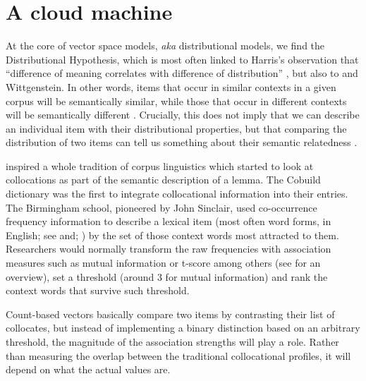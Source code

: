 \documentclass[
]{book}
\begin{document}
\hypertarget{vector-creation}{%
\section{A cloud machine}\label{vector-creation}}

At the core of vector space models, \emph{aka} distributional models, we find the Distributional Hypothesis, which is most often linked to Harris's observation that ``difference of meaning correlates with difference of distribution'' \autocite*[ 156]{harris_1954}, but also to \textcite{firth_1957a} and Wittgenstein.
In other words, items that occur in similar contexts in a given corpus will be semantically similar, while those that occur in different contexts will be semantically different \autocites[Ch. 6]{jurafsky.martin_2020}{lenci_2018}. Crucially, this does not imply that we can describe an individual item with their distributional properties, but that comparing the distribution of two items can tell us something about their semantic relatedness \autocite[ 19]{sahlgren_2006}.

\textcite{firth_1957a} inspired a whole tradition of corpus linguistics which started to look at collocations as part of the semantic description of a lemma. The Cobuild dictionary was the first to integrate collocational information into their entries. The Birmingham school, pioneered by John Sinclair, used co-occurrence frequency information to describe a lexical item (most often word forms, in English; see \textcite[29]{sinclair_1991} and; \textcite[23-24]{stubbs_1995}) by the set of those context words most attracted to them. Researchers would normally transform the raw frequencies with association measures such as mutual information
\autocites[ 33]{church.hanks_1989,stubbs_1995}{mcenery.etal_2010,gablasova.etal_2017}
or t-score
among others (see \textcite{gablasova.etal_2017} for an overview),
set a threshold (around 3 for mutual information)
and rank the context words that survive such threshold.

Count-based vectors basically compare two items by contrasting their list of collocates, but instead of implementing a binary distinction based on an arbitrary threshold,
the magnitude of the association strengths will play a role. Rather than measuring the overlap between the traditional collocational profiles, it will depend on what the actual values are.
\end{document}

